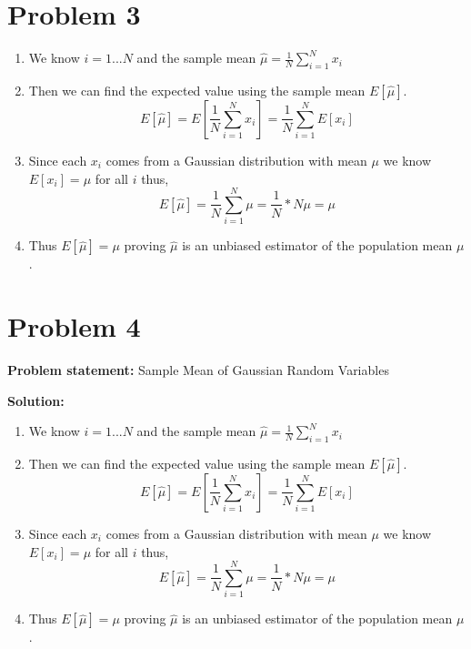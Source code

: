 \documentclass[12pt]{article}
\begin{document}
\section*{Problem 3}

\begin{enumerate}
    \item We know $i = 1 ... N$ and the sample mean $\hat{\mu} = \frac{1}{N}\sum_{i=1}^{N}x_{i}$
    \item Then we can find the expected value using the sample mean $E[\hat{\mu}]$.
    \[
    E[\hat{\mu}] = E\left[\frac{1}{N}\sum_{i=1}^{N}x_{i}\right] = \frac{1}{N}\sum_{i=1}^{N}E[x_{i}]
    \]
    \item Since each $x_{i}$ comes from a Gaussian distribution with mean $\mu$ we know $E[x_{i}] = \mu$ for all $i$ thus,
    \[
    E[\hat{\mu}] = \frac{1}{N}\sum_{i=1}^{N}\mu = \frac{1}{N}*N\mu = \mu
    \]
    \item Thus $E[\hat{\mu}] = \mu$ proving $\hat{\mu}$ is an unbiased estimator of the population mean $\mu$.
\end{enumerate}

\section*{Problem 4}
\textbf{Problem statement:} Sample Mean of Gaussian Random Variables

\bigskip

\textbf{Solution:}

\begin{enumerate}
    \item We know $i = 1 ... N$ and the sample mean $\hat{\mu} = \frac{1}{N}\sum_{i=1}^{N}x_{i}$
    \item Then we can find the expected value using the sample mean $E[\hat{\mu}]$.
    \[
    E[\hat{\mu}] = E\left[\frac{1}{N}\sum_{i=1}^{N}x_{i}\right] = \frac{1}{N}\sum_{i=1}^{N}E[x_{i}]
    \]
    \item Since each $x_{i}$ comes from a Gaussian distribution with mean $\mu$ we know $E[x_{i}] = \mu$ for all $i$ thus,
    \[
    E[\hat{\mu}] = \frac{1}{N}\sum_{i=1}^{N}\mu = \frac{1}{N}*N\mu = \mu
    \]
    \item Thus $E[\hat{\mu}] = \mu$ proving $\hat{\mu}$ is an unbiased estimator of the population mean $\mu$.
\end{enumerate}
\end{document}
